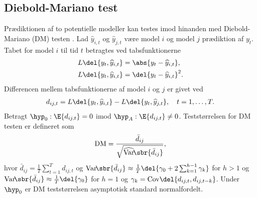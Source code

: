 \subsection{Diebold-Mariano test}
Prædiktionen af to potentielle modeller kan testes imod hinanden med Diebold-Mariano (DM) testen \citep{dmtest}.
Lad \(\widehat{y}_{i,t}\) og \(\widehat{y}_{j,t}\) være model \(i\) og model \(j\) prædiktion af \(y_{t}\).
Tabet for model \(i\) til tid \(t\) betragtes ved tabsfunktionerne
\begin{align}
L \del{y_t, \widehat{y}_{i,t}} &= \abs{y_t - \widehat{y}_{i,t}}, \label{eq:lossMAE} \\
L \del{y_t, \widehat{y}_{i,t}} &= \del{y_t - \widehat{y}_{i,t}}^2. \label{eq:lossMSE}
\end{align}
Differencen mellem tabsfunktionerne af model \(i\) og \(j\) er givet ved 
\begin{align*}
d_{ij,t} = L \del{y_t, \widehat{y}_{i,t}} - L \del{y_t, \widehat{y}_{j,t}}, \quad t = 1, \ldots, T.
\end{align*}
%
Betragt \(\hyp_0 : \E{d_{ij,t}} = 0\) imod \(\hyp_A: \E{d_{ij,t}} \neq 0\). Teststørrelsen for DM testen er defineret som
\begin{align*}
\text{DM} = \frac{\bar{d}_{ij}}{\sqrt{\widehat{\mathrm{Var}}\!\sbr{\bar{d}_{ij}}}},
\end{align*}
hvor \(\bar{d}_{ij} = \frac{1}{T} \sum_{t = 1}^T d_{ij,t}\) og 
\(\mathrm{Var}\!\sbr{\bar{d}_{ij}} \approx \frac{1}{T} \del{\gamma_0 + 2 \sum_{k=1}^{h-1} \gamma_k}\) for \(h > 1 \) og \(\mathrm{Var}\!\sbr{\bar{d}_{ij}} \approx \frac{1}{T} \del{\gamma_0}\) for \(h = 1\) og \(\gamma_k = \text{Cov} \del{d_{ij,t}, d_{ij,t-k}}\). 
%
Under \(\hyp_0\) er DM teststørrelsen asymptotisk standard normalfordelt. 
